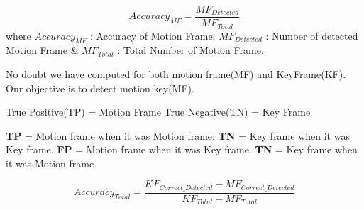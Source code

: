 \[Accuracy_{MF} = \frac{MF_{Detected}}{MF_{Total}}\]
where $Accuracy_{MF}$ : Accuracy of Motion Frame,\newline 
$MF_{Detected}$ : Number of detected Motion Frame \& \newline
$MF_{Total}$ : Total Number of Motion Frame.\newline

No doubt we have computed for both motion frame(MF) and KeyFrame(KF). Our objective is to detect motion key(MF).

True Positive(TP) = Motion Frame
True Negative(TN) = Key Frame

\textbf{TP} = Motion frame when it was Motion frame.\newline
\textbf{TN} = Key frame when it was Key frame.\newline
\textbf{FP} = Motion frame when it was Key frame.\newline
\textbf{TN} = Key frame when it was Motion frame.\newline

\[
Accuracy_{Total} = \frac{KF_{Correct\_Detected} + MF_{Correct\_Detected}}{KF_{Total} + MF_{Total}}
\]
